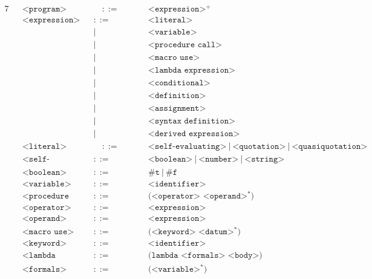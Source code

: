 \documentclass{article}
\begin{document}
\begin{alignat*}{7}
&& \texttt{<program>}    &&\quad ::= &\quad && \texttt{<expression>$^+$}\\[1mm]
&& \texttt{<expression>}    &&::= &\quad && \texttt{<literal>}\\
&&                       && |   &\quad && \texttt{<variable>}  \\[1mm]
&&                       && |   &\quad && \texttt{<procedure call>}  \\[1mm]
&&                       && |   &\quad && \texttt{<macro use>}  \\[1mm]
&&                       && |   &\quad && \texttt{<lambda expression>}  \\[1mm]
&&                       && |   &\quad && \texttt{<conditional>}  \\[1mm]
&&                       && |   &\quad && \texttt{<definition>} \\[1mm]
&&                       && |   &\quad && \texttt{<assignment>}  \\[1mm]
&&                       && |   &\quad && \texttt{<syntax definition>} \\[1mm]
&&                       && |   &\quad && \texttt{<derived expression>}  \\[1mm]
&& \texttt{<literal>}  &&\quad ::= &\quad && \texttt{<self-evaluating>}\ | \ \texttt{<quotation>}\ |\ \texttt{<quasiquotation>}\\[1mm]
&& \texttt{<self-evaluating>}  && ::= &\quad && \texttt{<boolean>}\ | \ \texttt{<number>}\ |\ \texttt{<string>}\\[1mm]
&& \texttt{<boolean>} && ::= &\quad && \texttt{\#t}\ |\ \texttt{\#f}\\[1mm]
&& \texttt{<variable>} && ::= &\quad && \texttt{<identifier>}\\[1mm]
&& \texttt{<procedure call>}  && ::= &\quad && \texttt{(<operator> <operand>$^*$)}\\[1mm]
&& \texttt{<operator>}  && ::= &\quad && \texttt{<expression>}\\[1mm]
&& \texttt{<operand>}  && ::= &\quad && \texttt{<expression>}\\[1mm]
&& \texttt{<macro use>}  && ::= &\quad && \texttt{(<keyword> <datum>$^*$)}  \\[1mm]
&& \texttt{<keyword>}  && ::= &\quad && \texttt{<identifier>}  \\[1mm]
&& \texttt{<lambda expression>}  && ::= &\quad && \texttt{(lambda <formals> <body>)}\\[1mm]
&& \texttt{<formals>}    &&::= &\quad && \texttt{(<variable>$^*$)}\\

\end{alignat*}
\end{document}
